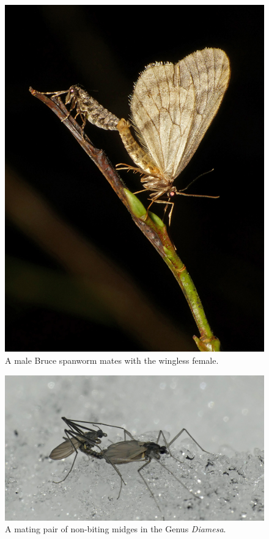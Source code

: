 \begin{multicols}{2}
\begin{figure}[H]
\begin{center}
\vspace{2mm}
\includegraphics[width=\textwidth]{img/bruce_spanworm.jpg}
\caption{A male Bruce spanworm mates with the wingless female.}
\label{bruce_spanworm}
\end{center}
\end{figure}


\end{multicols}
\begin{figure}[H]
\begin{center}
\vspace{2mm}
\includegraphics[width=\textwidth]{img/Chironomidae.jpg}
\caption{A mating pair of non-biting midges in the Genus \textit{Diamesa}.}
\label{Chironomidae}
\end{center}
\end{figure} 
